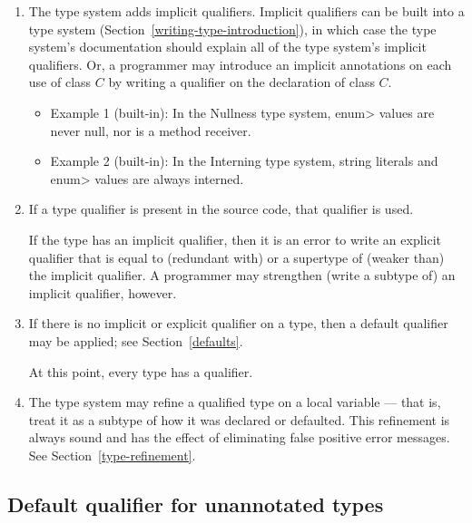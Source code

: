 \begin{enumerate}
\item
  The type system adds implicit qualifiers.  Implicit qualifiers can be
  built into a type system (Section~\ref{writing-type-introduction}), in
  which case the type system's documentation should explain all of the type
  system's implicit qualifiers.  Or, a programmer may introduce an implicit
  annotations on each use of class $C$ by writing a qualifier on the
  declaration of class $C$.

\begin{itemize}
\item
  Example 1 (built-in):  In the Nullness type system,
  \<enum> values are never null, nor is a method receiver.
\item
  Example 2 (built-in):  In the Interning type system, string literals
  and \<enum> values are always interned.
\end{itemize}

\item
  If a type qualifier is present in the source code, that qualifier is used.

  If the type has an implicit qualifier, then it is an error to write an
  explicit qualifier that is equal to (redundant with) or a supertype of
  (weaker than) the implicit qualifier.  A programmer may strengthen
  (write a subtype of) an implicit qualifier, however.

\item
  If there is no implicit or explicit qualifier on a type, then a default
  qualifier may be applied; see Section~\ref{defaults}.  

  \smallskip

  At this point, every type has a qualifier.

\item
  The type system may refine a qualified type on a local variable --- that
  is, treat it as a subtype of how it was declared or defaulted.  This
  refinement is always sound and has the effect of eliminating false
  positive error messages.  See Section~\ref{type-refinement}.


\end{enumerate}



\subsection{Default qualifier for unannotated types\label{defaults}}

